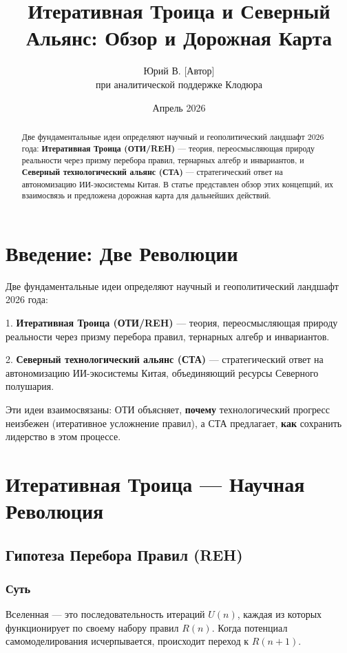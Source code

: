 \documentclass[11pt, a4paper]{article}
\title{\textbf{Итеративная Троица и Северный Альянс: Обзор и Дорожная Карта}}
\author{Юрий В. [Автор]\\ при аналитической поддержке Клодюра}
\date{Апрель 2026}
\begin{document}
\maketitle

\begin{abstract}
Две фундаментальные идеи определяют научный и геополитический ландшафт 2026 года: 
\textbf{Итеративная Троица (ОТИ/REH)} --- теория, переосмысляющая природу реальности через призму перебора правил, тернарных алгебр и инвариантов, и 
\textbf{Северный технологический альянс (СТА)} --- стратегический ответ на автономизацию ИИ-экосистемы Китая. 
В статье представлен обзор этих концепций, их взаимосвязь и предложена дорожная карта для дальнейших действий.
\end{abstract}

\section*{Введение: Две Революции}
Две фундаментальные идеи определяют научный и геополитический ландшафт 2026 года:

1. \textbf{Итеративная Троица (ОТИ/REH)} --- теория, переосмысляющая природу реальности через призму перебора правил, тернарных алгебр и инвариантов.

2. \textbf{Северный технологический альянс (СТА)} --- стратегический ответ на автономизацию ИИ-экосистемы Китая, объединяющий ресурсы Северного полушария.

Эти идеи взаимосвязаны: ОТИ объясняет, \textbf{почему} технологический прогресс неизбежен (итеративное усложнение правил), а СТА предлагает, \textbf{как} сохранить лидерство в этом процессе.

\section{Итеративная Троица --- Научная Революция}

\subsection{Гипотеза Перебора Правил (REH)}
\subsubsection*{Суть}
Вселенная --- это последовательность итераций $U(n)$, каждая из которых функционирует по своему набору правил $R(n)$. Когда потенциал самомоделирования исчерпывается, происходит переход к $R(n+1)$.
\end{document}
